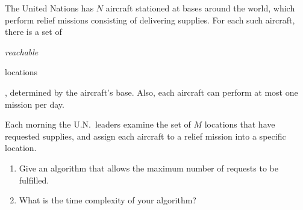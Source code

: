 The United Nations has $N$ aircraft stationed at bases around the
world, which perform relief missions consisting of delivering
supplies.  For each such aircraft, there is a set of {\em reachable

locations}, determined by the aircraft's base.  Also, each aircraft can
perform at most one mission per day.

Each morning the U.N.\  leaders examine the set of $M$ locations that
have requested supplies, and assign each aircraft to a relief mission
into a specific location.

\begin{enumerate}

\item  Give an algorithm that allows the maximum number of
requests to be fulfilled.

\item  What is the time complexity of your algorithm?

\end{enumerate}
